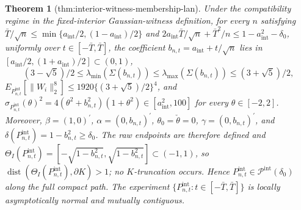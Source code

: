\documentclass{article}
\newtheorem{theorem}{Theorem}
\begin{document}
\begin{theorem}[thm:interior-witness-membership-lan]\label{thm:interior-witness-membership-lan}
Under the compatibility regime in the fixed-interior Gaussian-witness definition, for every \(n\) satisfying \(\bar T/\sqrt n\leq\min\{a_{\mathrm{int}}/2,(1-a_{\mathrm{int}})/2\}\) and \(2a_{\mathrm{int}}\bar T/\sqrt n+\bar T^2/n\leq1-a_{\mathrm{int}}^2-\delta_0\), uniformly over \(t\in[-\bar T,\bar T]\), the coefficient \(b_{n,t}=a_{\mathrm{int}}+t/\sqrt n\) lies in \([a_{\mathrm{int}}/2,(1+a_{\mathrm{int}})/2]\subset(0,1)\), \[(3-\sqrt5)/2\leq\lambda_{\min}(\Sigma(b_{n,t}))\leq\lambda_{\max}(\Sigma(b_{n,t}))\leq(3+\sqrt5)/2,\] \(E_{P_{n,t}^{\mathrm{int}}}[\|W_i\|_2^8]\leq1920\{(3+\sqrt5)/2\}^4\), and \(\sigma_{P_{n,t}^{\mathrm{int}}}(\theta)^2=4(\theta^2+b_{n,t}^2)(1+\theta^2)\in[a_{\mathrm{int}}^2,100]\) for every \(\theta\in[-2,2]\). Moreover, \(\beta=(1,0)^{\prime}\), \(\alpha=(0,b_{n,t})^{\prime}\), \(\theta_0=\check\theta=0\), \(\gamma=(0,b_{n,t})^{\prime}\), and \(\delta(P_{n,t}^{\mathrm{int}})=1-b_{n,t}^2\geq\delta_0\). The raw endpoints are therefore defined and \(\Theta_I(P_{n,t}^{\mathrm{int}})=[-\sqrt{1-b_{n,t}^2},\sqrt{1-b_{n,t}^2}]\subset(-1,1)\), so \(\operatorname{dist}(\Theta_I(P_{n,t}^{\mathrm{int}}),\partial K)>1\); no \(K\)-truncation occurs. Hence \(P_{n,t}^{\mathrm{int}}\in\mathcal P^{\mathrm{int}}(\delta_0)\) along the full compact path. The experiment \(\{P_{n,t}^{\mathrm{int}}:t\in[-\bar T,\bar T]\}\) is locally asymptotically normal and mutually contiguous.
\end{theorem}
\end{document}
